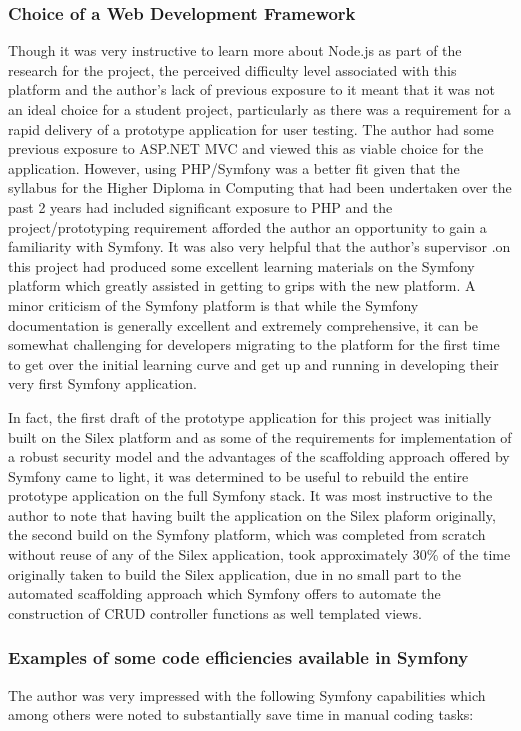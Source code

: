 \documentclass[a4paper,Times New Roman 11pt]{article}
\begin{document}
\subsubsection{Choice of a Web Development Framework}

Though it was very instructive to learn more about Node.js as part of the research for the project, the perceived difficulty level associated with this platform and the author's lack of previous exposure to it meant that it was not an ideal choice for a student project, particularly as there was a requirement for a rapid delivery of a prototype application for user testing. The author had some previous exposure to ASP.NET MVC and viewed this as viable choice for the application. However, using PHP/Symfony was a better fit given that the syllabus for the Higher Diploma in Computing that had been undertaken over the past 2 years had included significant exposure to PHP and the project/prototyping requirement afforded the author an opportunity to gain a familiarity with Symfony. It was also very helpful that the author's supervisor \parencite{smith}.on this project had produced some excellent learning materials on the Symfony platform which greatly assisted in getting to grips with the new platform. A minor criticism of the Symfony platform is that while the Symfony documentation \parencite{weaver} is generally excellent and extremely comprehensive, it can be somewhat challenging for developers migrating to the platform for the first time to get over the initial learning curve and get up and running in developing their very first Symfony application.

In fact, the first draft of the prototype application for this project was initially built on the Silex platform and as some of the requirements for implementation of a robust security model and the advantages of the scaffolding approach offered by Symfony came to light, it was determined to be useful to rebuild the entire prototype application on the full Symfony stack. It was most instructive to the author to note that having built the application on the Silex plaform originally, the second build on the Symfony platform, which was completed from scratch without reuse of any of the Silex application, took approximately 30\% of the time originally taken to build the Silex application, due in no small part to the automated scaffolding approach which Symfony offers to automate the construction of CRUD controller functions as well templated views. 
\subsubsection{Examples of some code efficiencies available in Symfony}
The author was very impressed with the following Symfony capabilities which among others were noted to substantially save time in manual coding tasks:
\end{document}
